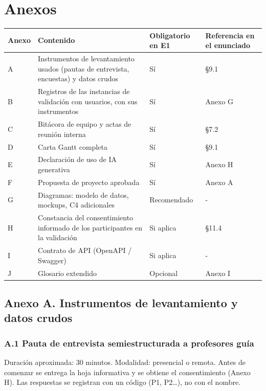 \documentclass[10pt,a4paper]{article}
\newcommand{\hrow}{\rowcolor{encabezado}}
\newcommand{\h}[1]{\textbf{#1}}
\begin{document}
\section{Anexos}
\begin{xltabular}{\linewidth}{|P{1.4cm}|L|P{2.8cm}|P{3.4cm}|}
\hline\hrow \h{Anexo} & \h{Contenido} & \h{Obligatorio en E1} & \h{Referencia en el enunciado} \\ \hline
\endhead
A & Instrumentos de levantamiento usados (pautas de entrevista, encuestas) y datos crudos & Sí & §9.1 \\ \hline
B & Registros de las instancias de validación con usuarios, con sus instrumentos & Sí & Anexo G \\ \hline
C & Bitácora de equipo y actas de reunión interna & Sí & §7.2 \\ \hline
D & Carta Gantt completa & Sí & §9.1 \\ \hline
E & Declaración de uso de IA generativa & Sí & Anexo H \\ \hline
F & Propuesta de proyecto aprobada & Sí & Anexo A \\ \hline
G & Diagramas: modelo de datos, mockups, C4 adicionales & Recomendado & - \\ \hline
H & Constancia del consentimiento informado de los participantes en la validación & Si aplica & §11.4 \\ \hline
I & Contrato de API (OpenAPI / Swagger) & Si aplica & - \\ \hline
J & Glosario extendido & Opcional & Anexo I \\ \hline
\end{xltabular}

\subsection*{Anexo A. Instrumentos de levantamiento y datos crudos}

\subsubsection*{A.1 Pauta de entrevista semiestructurada a profesores guía}
Duración aproximada: 30 minutos. Modalidad: presencial o remota. Antes de comenzar se entrega la hoja informativa y se obtiene el consentimiento (Anexo H). Las respuestas se registran con un código (P1, P2…), no con el nombre.
\end{document}
